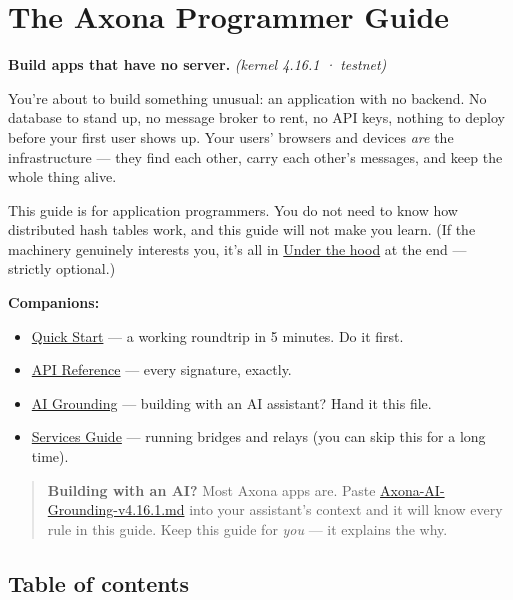 \documentclass[
  nobib]{tufte-handout}
\author{}
\date{}
\providecommand{\tightlist}{%
  \setlength{\itemsep}{0pt}\setlength{\parskip}{0pt}}
\begin{document}
\section{The Axona Programmer Guide}\label{the-axona-programmer-guide}

\textbf{Build apps that have no server.} \emph{(kernel 4.16.1 ·
testnet)}

You're about to build something unusual: an application with no backend.
No database to stand up, no message broker to rent, no API keys, nothing
to deploy before your first user shows up. Your users' browsers and
devices \emph{are} the infrastructure --- they find each other, carry
each other's messages, and keep the whole thing alive.

This guide is for application programmers. You do not need to know how
distributed hash tables work, and this guide will not make you learn.
(If the machinery genuinely interests you, it's all in
\hyperref[9-under-the-hood--optional]{Under the hood} at the end ---
strictly optional.)

\textbf{Companions:}

\begin{itemize}
\tightlist
\item
  \href{Quick-Start-v4.16.1.md}{Quick Start} --- a working roundtrip in
  5 minutes. Do it first.
\item
  \href{Axona-API-Reference-v4.16.1.md}{API Reference} --- every
  signature, exactly.
\item
  \href{Axona-AI-Grounding-v4.16.1.md}{AI Grounding} --- building with
  an AI assistant? Hand it this file.
\item
  \href{Axona-Services-Guide-v4.16.1.md}{Services Guide} --- running
  bridges and relays (you can skip this for a long time).
\end{itemize}

\begin{quote}
\textbf{Building with an AI?} Most Axona apps are. Paste
\url{Axona-AI-Grounding-v4.16.1.md} into your assistant's context and it
will know every rule in this guide. Keep this guide for \emph{you} ---
it explains the why.
\end{quote}

\subsection{Table of contents}\label{table-of-contents}
\end{document}
